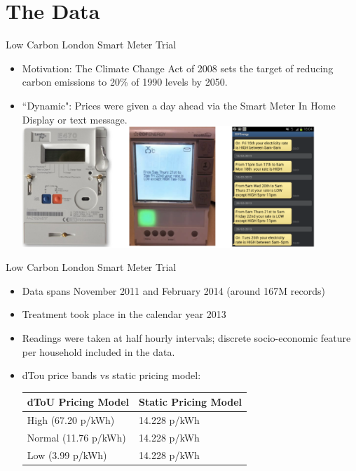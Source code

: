 \documentclass{beamer}
\begin{document}
\section{The Data}

\begin{frame}{Low Carbon London Smart Meter Trial}
  \begin{itemize}
    \item<+-> Motivation: The Climate Change Act of 2008 sets the target of reducing carbon emissions to 20\% of 1990 levels by 2050.
    \item<+-> ``Dynamic": Prices were given a day ahead via the Smart Meter In Home Display or text message.
    \vspace{0.3cm}
    \centering
    \includegraphics[width=0.87\textwidth]{images/day-ahead-pricing.png}
  \end{itemize}
\end{frame}

\begin{frame}{Low Carbon London Smart Meter Trial}
  \begin{itemize}
    \item<+-> Data spans November 2011 and February 2014 (around 167M records)
    \item<+-> Treatment took place in the calendar year 2013
    \item<+-> Readings were taken at half hourly intervals; discrete socio-economic feature per household included in the data.
    \item<+-> dTou price bands vs static pricing model:
    \begin{table}[]
      \vspace{0.2cm}
      \centering
      \begin{tabular}{|l|l|}
        \hline
        dToU Pricing Model & Static Pricing Model \\ \hline
        High (67.20 p/kWh) & 14.228 p/kWh \\ \hline
        Normal (11.76 p/kWh) & 14.228 p/kWh \\ \hline
        Low (3.99 p/kWh) & 14.228 p/kWh \\ \hline
      \end{tabular}
    \end{table}
  \end{itemize}
\end{frame}
\end{document}
